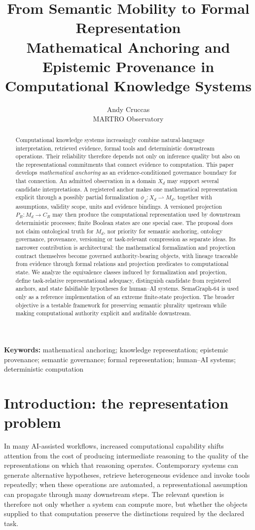 \documentclass[11pt,a4paper]{article}
\title{From Semantic Mobility to Formal Representation\\[3pt]
\large Mathematical Anchoring and Epistemic Provenance in Computational Knowledge Systems}
\author{Andy Cruccas\\MARTRO Observatory}
\date{}
\begin{document}
\maketitle

\begin{abstract}
Computational knowledge systems increasingly combine natural-language interpretation, retrieved evidence, formal tools and deterministic downstream operations. Their reliability therefore depends not only on inference quality but also on the representational commitments that connect evidence to computation. This paper develops \emph{mathematical anchoring} as an evidence-conditioned governance boundary for that connection. An admitted observation in a domain $X_d$ may support several candidate interpretations. A registered anchor makes one mathematical representation explicit through a possibly partial formalization $\phi_d:X_d\rightharpoonup M_d$, together with assumptions, validity scope, units and evidence bindings. A versioned projection $P_R:M_d\rightarrow C_R$ may then produce the computational representation used by downstream deterministic processes; finite Boolean states are one special case. The proposal does not claim ontological truth for $M_d$, nor priority for semantic anchoring, ontology governance, provenance, versioning or task-relevant compression as separate ideas. Its narrower contribution is architectural: the mathematical formalization and projection contract themselves become governed authority-bearing objects, with lineage traceable from evidence through formal relations and projection predicates to computational state. We analyze the equivalence classes induced by formalization and projection, define task-relative representational adequacy, distinguish candidate from registered anchors, and state falsifiable hypotheses for human--AI systems. SemaGraph-64 is used only as a reference implementation of an extreme finite-state projection. The broader objective is a testable framework for preserving semantic plurality upstream while making computational authority explicit and auditable downstream.
\end{abstract}

\noindent\textbf{Keywords:} mathematical anchoring; knowledge representation; epistemic provenance; semantic governance; formal representation; human--AI systems; deterministic computation

\medskip

\section{Introduction: the representation problem}
In many AI-assisted workflows, increased computational capability shifts attention from the cost of producing intermediate reasoning to the quality of the representations on which that reasoning operates. Contemporary systems can generate alternative hypotheses, retrieve heterogeneous evidence and invoke tools repeatedly; when these operations are automated, a representational assumption can propagate through many downstream steps. The relevant question is therefore not only whether a system can compute more, but whether the objects supplied to that computation preserve the distinctions required by the declared task.
\end{document}

